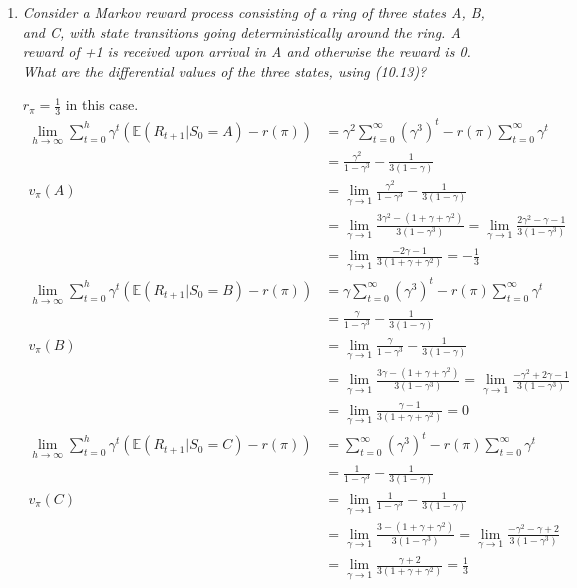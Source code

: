 \documentclass[12pt,a4paper]{article}
\begin{document}
\begin{enumerate}
  \item \textit{Consider a Markov reward process consisting of a ring of three states A, B,
  and C, with state transitions going deterministically around the ring. A reward of +1 is
  received upon arrival in A and otherwise the reward is 0. What are the differential values
  of the three states, using (10.13)?}

  $r_\pi = \frac{1}{3}$ in this case.
  \begin{align*}
    \lim\limits_{h \rightarrow \infty}
    \sum\limits_{t = 0}^h \gamma^t(\mathbb{E}(R_{t + 1} | S_0 = A) - r(\pi))
    &= \gamma^2 \sum\limits_{t = 0}^\infty (\gamma^3)^t - r(\pi)
    \sum\limits_{t = 0}^\infty \gamma^t\\
    &= \frac{\gamma^2}{1 - \gamma^3} - \frac{1}{3(1 - \gamma)}\\
    v_\pi(A) &= \lim\limits_{\gamma \rightarrow 1}
    \frac{\gamma^2}{1 - \gamma^3} - \frac{1}{3(1 - \gamma)}\\
    &= \lim\limits_{\gamma \rightarrow 1}
    \frac{3 \gamma^2 - (1 + \gamma + \gamma^2)}{3(1 - \gamma^3)}
    = \lim\limits_{\gamma \rightarrow 1}
    \frac{2\gamma^2 - \gamma - 1}{3(1 - \gamma^3)}\\
    &= \lim\limits_{\gamma \rightarrow 1} \frac{-2 \gamma - 1}{3(1 + \gamma + \gamma^2)}
    = -\frac{1}{3}\\
    \lim\limits_{h \rightarrow \infty}
    \sum\limits_{t = 0}^h \gamma^t(\mathbb{E}(R_{t + 1} | S_0 = B) - r(\pi))
    &= \gamma \sum\limits_{t = 0}^\infty (\gamma^3)^t - r(\pi)
    \sum\limits_{t = 0}^\infty \gamma^t\\
    &= \frac{\gamma}{1 - \gamma^3} - \frac{1}{3(1 - \gamma)}\\
    v_\pi(B) &= \lim\limits_{\gamma \rightarrow 1}
    \frac{\gamma}{1 - \gamma^3} - \frac{1}{3(1 - \gamma)}\\
    &= \lim\limits_{\gamma \rightarrow 1}
    \frac{3 \gamma - (1 + \gamma + \gamma^2)}{3(1 - \gamma^3)}
    = \lim\limits_{\gamma \rightarrow 1}
    \frac{-\gamma^2 + 2 \gamma - 1}{3(1 - \gamma^3)}\\
    &= \lim\limits_{\gamma \rightarrow 1} \frac{\gamma - 1}{3(1 + \gamma + \gamma^2)}
    = 0\\
    \lim\limits_{h \rightarrow \infty}
    \sum\limits_{t = 0}^h \gamma^t(\mathbb{E}(R_{t + 1} | S_0 = C) - r(\pi))
    &= \sum\limits_{t = 0}^\infty (\gamma^3)^t - r(\pi)
    \sum\limits_{t = 0}^\infty \gamma^t\\
    &= \frac{1}{1 - \gamma^3} - \frac{1}{3(1 - \gamma)}\\
    v_\pi(C) &= \lim\limits_{\gamma \rightarrow 1}
    \frac{1}{1 - \gamma^3} - \frac{1}{3(1 - \gamma)}\\
    &= \lim\limits_{\gamma \rightarrow 1}
    \frac{3 - (1 + \gamma + \gamma^2)}{3(1 - \gamma^3)}
    = \lim\limits_{\gamma \rightarrow 1}
    \frac{-\gamma^2 - \gamma  + 2}{3(1 - \gamma^3)}\\
    &= \lim\limits_{\gamma \rightarrow 1} \frac{\gamma + 2}{3(1 + \gamma + \gamma^2)}
    = \frac{1}{3}\\
  \end{align*}
\end{enumerate}
\end{document}
